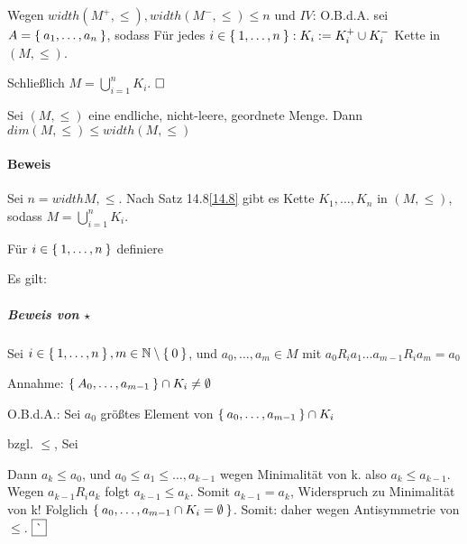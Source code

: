 \documentclass{../../meta/tudscript}
\begin{document}
    Wegen $width (M^+, \leq), width (M^-, \leq) \leq n$ und $\boxed{IV}$:
    O.B.d.A. sei $A = \Set{a_1, \ldots, a_n}$, sodass
    Für jedes $i \in \Set{1, \ldots, n}: K_i := K_{i}^+ \cup K_{i}^-$ Kette in $(M, \leq)$.

    Schließlich $M = \bigcup_{i = 1}^n K_i.$
    $\hfill\square$

    Sei $(M, \leq)$ eine endliche, nicht-leere, geordnete Menge. Dann $dim (M, \leq) \leq width (M, \leq)$

    \paragraph{Beweis}

    Sei $n = width{M, \leq}$. Nach Satz 14.8\ref{14.8} gibt es Kette $K_1, \ldots, K_n$
    in $(M, \leq)$, sodass $M = \bigcup_{i = 1}^n K_i$.

    Für $i \in \Set{1, \ldots, n}$ definiere

    Es gilt:
    
    \subparagraph{Beweis von $\star$}

    Sei $i \in \Set{1, \ldots, n}, m \in \mathbb{N} \setminus \Set{0}$, und $a_0, \ldots, a_m \in M$ mit
    $a_0 R_i a_1 \ldots a_{m-1} R_i a_m = a_0$

    Annahme: $\Set{A_0, \ldots, a_{m-1}} \cap K_i \neq \emptyset$

    O.B.d.A.: Sei $a_0$ größtes Element von $\Set{a_0, \ldots, a_{m-1}} \cap K_i$

    bzgl. $\leq$, Sei 
    
    Dann $a_k \leq a_0$, und $a_0 \leq a_1 \leq \ldots, a_{k-1}$ wegen Minimalität
    von k. also $a_k \leq a_{k-1}$.
    Wegen $a_{k-1} R_i a_k$ folgt $a_{k-1} \leq a_k$. Somit $a_{k-1} = a_k$,
    Widerspruch zu Minimalität von k!    
    Folglich $\Set{a_0, \ldots, a_{m - 1} \cap K_i = \emptyset}$.
    Somit:
    daher
    wegen Antisymmetrie von $\leq$.
     $\hfill\boxed{\lightning}$
\end{document}
